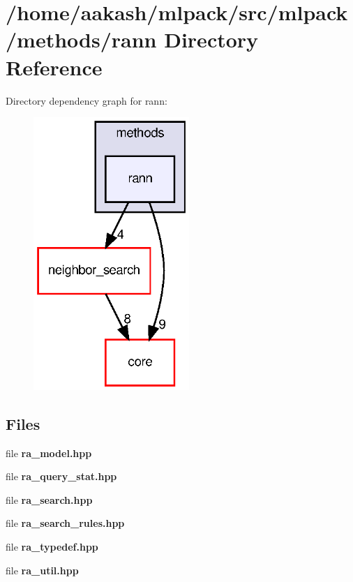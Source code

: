 \section{/home/aakash/mlpack/src/mlpack/methods/rann Directory Reference}
\label{dir_b3b2a45410bb0010ddefc979f918eabf}
Directory dependency graph for rann\+:
\nopagebreak
\begin{figure}[H]
\begin{center}
\leavevmode
\includegraphics[width=167pt]{dir_b3b2a45410bb0010ddefc979f918eabf_dep}
\end{center}
\end{figure}
\subsection*{Files}
\begin{DoxyCompactItemize}
\item 
file \textbf{ ra\+\_\+model.\+hpp}
\item 
file \textbf{ ra\+\_\+query\+\_\+stat.\+hpp}
\item 
file \textbf{ ra\+\_\+search.\+hpp}
\item 
file \textbf{ ra\+\_\+search\+\_\+rules.\+hpp}
\item 
file \textbf{ ra\+\_\+typedef.\+hpp}
\item 
file \textbf{ ra\+\_\+util.\+hpp}
\end{DoxyCompactItemize}
